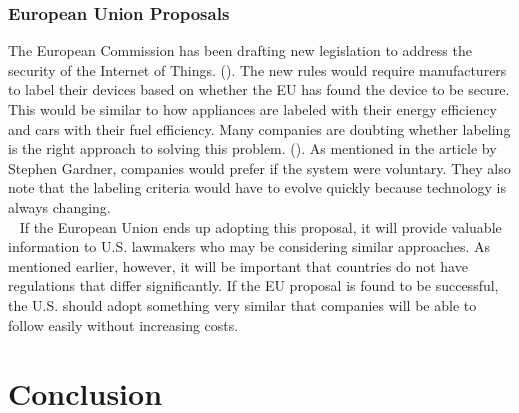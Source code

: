 \documentclass[letterpaper, 12pt]{article}
\begin{document}
\begin{flushleft}
\subsubsection*{European Union Proposals}

The European Commission has been drafting new legislation to address the security of the Internet of Things. (\cite{Stupp}). The new rules would require
manufacturers to label their devices based on whether the EU has found the device to be secure. This would be similar to how appliances are labeled with
their energy efficiency and cars with their fuel efficiency. Many companies are doubting whether labeling is the right approach to solving this problem.
(\cite{Gardner}). As mentioned in the article by Stephen Gardner, companies would prefer if the system were voluntary. They also note that the labeling 
criteria would have to evolve quickly because technology is always changing.\\
~\newline
If the European Union ends up adopting this proposal, it will provide valuable information to U.S. lawmakers who may be considering similar approaches. As mentioned
earlier, however, it will be important that countries do not have regulations that differ significantly. If the EU proposal is found to be successful, the U.S. should
adopt something very similar that companies will be able to follow easily without increasing costs. 




\section*{Conclusion}


\end{flushleft}
\end{document}
